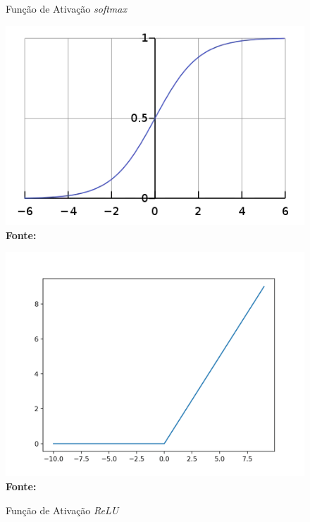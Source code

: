 \begin{figure}[ht]
\centering
\begin{minipage}{0.45\textwidth}
  \centering
  \caption[\hspace{0.1cm}Grade Computacional.]{Função de Ativação \textit{softmax}}
  \vspace{-0.4cm}
  \includegraphics[width=\linewidth]{figuras/softmax.png}
  \captionsetup{justification=centering}
  \vspace{-0.2cm}
  \\\textbf{\footnotesize Fonte: \cite{softmax}}
  \label{fig:softmax}
\end{minipage}\hfill
\begin{minipage}{0.45\textwidth}
  \centering
  \caption[\hspace{0.1cm}Grade Computacional.]{Função de Ativação \textit{ReLU}}
  \vspace{-0.4cm}
  \includegraphics[width=\linewidth]{figuras/relu.png}
  \captionsetup{justification=centering}
  \vspace{-0.2cm}
  \\\textbf{\footnotesize Fonte: \cite{relu}}
  \label{fig:relu}
\end{minipage}
\end{figure}


